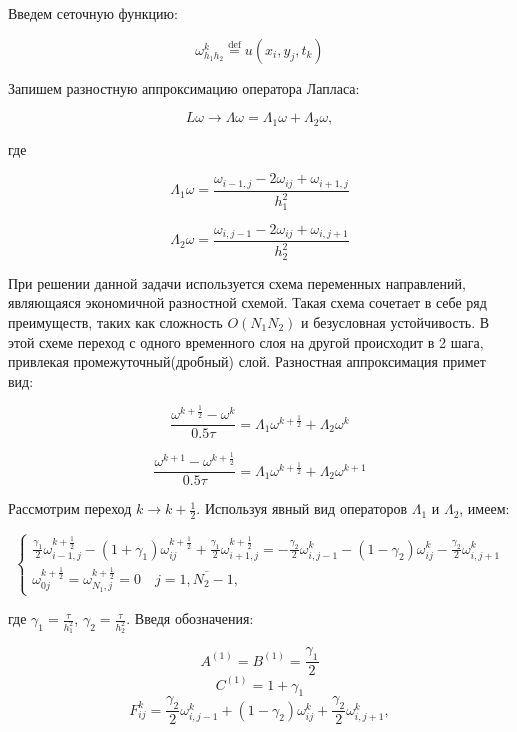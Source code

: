 \documentclass[12pt]{article}
\begin{document}
			Введем сеточную функцию:
			
			$$\omega^k_{h_1 h_2} \overset{\mathrm{def}}{=} u(x_i, y_j, t_k)$$
			
			Запишем разностную аппроксимацию оператора Лапласа:
			
			$$L\omega \rightarrow \Lambda\omega = \Lambda_1\omega + \Lambda_2 \omega,$$
			
			где
			
			$$\Lambda_1\omega = \frac{\omega_{i-1,j} - 2\omega_{ij} + \omega_{i+1,j}}{h^2_1}$$
			
			$$\Lambda_2\omega = \frac{\omega_{i,j-1} - 2\omega_{ij} + \omega_{i,j+1}}{h^2_2}$$
			
			При решении данной задачи используется схема переменных направлений, являющаяся экономичной разностной схемой. Такая схема сочетает в себе ряд преимуществ, таких как сложность $O\left(N_1 N_2\right)$ и безусловная устойчивость.
			В этой схеме переход с одного временного слоя на другой происходит в 2 шага, привлекая промежуточный(дробный) слой. Разностная аппроксимация примет вид:
			
			$$\frac{\omega^{k+\frac{1}{2}} - \omega^k}{0.5\tau} = \Lambda_1 \omega^{k + \frac{1}{2}} + \Lambda_2 \omega^k$$
			
			$$\frac{ \omega^{k+1} - \omega^{k+\frac{1}{2}}}{0.5\tau} = \Lambda_1 \omega^{k + \frac{1}{2}} + \Lambda_2 \omega^{k+1}$$
			
			Рассмотрим переход $k \rightarrow k + \frac{1}{2}$. Используя явный вид операторов $\Lambda_1$ и $\Lambda_2$, имеем:
			
			\begin{equation}
				\begin{cases}
					\frac{\gamma_1}{2} \omega^{k+ \frac{1}{2}}_{i-1,j} - (1+ \gamma_1) \omega^{k+\frac{1}{2}}_{ij} + \frac{\gamma_1}{2} \omega^{k+\frac{1}{2}}_{i+1,j} = -\frac{\gamma_2}{2} \omega^k_{i,j-1} - (1 - \gamma_2) \omega^k_{ij} - \frac{\gamma_2}{2} \omega^k_{i,j+1} \\
					\omega^{k+\frac{1}{2}}_{0j} = \omega^{k+\frac{1}{2}}_{N_1,j} = 0 \quad j = \overline{1, N_2-1},
				\end{cases}
			\end{equation}
			
			где $\gamma_1 = \frac{\tau}{h_1^2}$, $\gamma_2 = \frac{\tau}{h_2^2}$.
			Введя обозначения:
			
			$$A^{(1)} = B^{(1)} = \frac{\gamma_1}{2}$$
			$$C^{(1)} = 1 + \gamma_1$$
			$$F^k_{ij} = \frac{\gamma_2}{2} \omega^k_{i,j-1} + (1 - \gamma_2) \omega^k_{ij} + \frac{\gamma_2}{2} \omega^k_{i,j+1},$$
		
\end{document}

